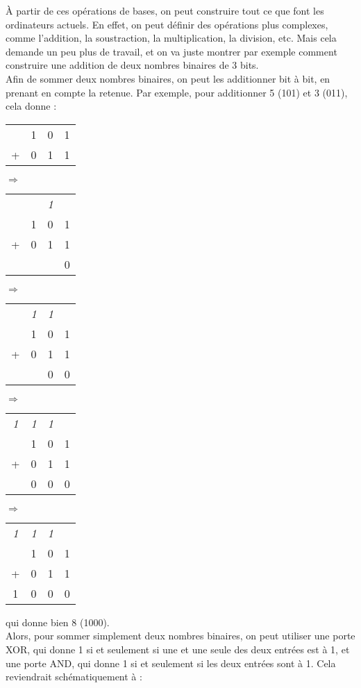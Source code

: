 À partir de ces opérations de bases, on peut construire tout ce que font les ordinateurs actuels.
En effet, on peut définir des opérations plus complexes, comme l'addition, la soustraction, la multiplication,
la division, etc.
Mais cela demande un peu plus de travail, et on va juste montrer par exemple comment construire une addition
de deux nombres binaires de 3 bits.\\
Afin de sommer deux nombres binaires, on peut les additionner bit à bit, en prenant en compte la retenue.
Par exemple, pour additionner 5 (101) et 3 (011), cela donne :
\begin{center}
    \begin{tabular}{cccc}
      & 1 & 0 & 1 \\
      + & 0 & 1 & 1 \\
      \hline
    \end{tabular}
    $\Rightarrow$
    \begin{tabular}{cccc}
        & & \textit{1} & \\
        & 1 & 0 & 1 \\
        + & 0 & 1 & 1 \\
        \hline
        & & & 0 \\
    \end{tabular}
    $\Rightarrow$
    \begin{tabular}{cccc}
        & \textit{1} & \textit{1} & \\
        & 1 & 0 & 1 \\
        + & 0 & 1 & 1 \\
        \hline
        & & 0 & 0 \\
    \end{tabular}
    $\Rightarrow$
    \begin{tabular}{cccc}
        \textit{1} & \textit{1} & \textit{1} & \\
        & 1 & 0 & 1 \\
        + & 0 & 1 & 1 \\
        \hline
        & 0 & 0 & 0 \\
    \end{tabular}
    $\Rightarrow$
    \begin{tabular}{cccc}
        \textit{1} & \textit{1} & \textit{1} & \\
        & 1 & 0 & 1 \\
        + & 0 & 1 & 1 \\
        \hline
         1 & 0 & 0 & 0 \\
    \end{tabular}
\end{center}
qui donne bien 8 (1000).\\
Alors, pour sommer simplement deux nombres binaires, on peut utiliser une porte XOR, qui donne 1 si et seulement
si une et une seule des deux entrées est à 1, et une porte AND, qui donne 1 si et seulement si les deux entrées
sont à 1.
Cela reviendrait schématiquement à :

